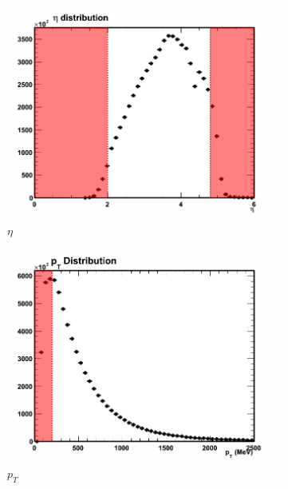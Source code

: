 \begin{figure}[h]
	\begin{subfigure}[h]{0.49\textwidth}
		\includegraphics[width=\textwidth]{./Chapters/multiplicity/images/track_selection_eta.png}
		\caption{$\eta$}
		\label{fig: track selection criteria eta}
	\end{subfigure}
	\begin{subfigure}[h]{0.49\textwidth}
		\includegraphics[width=\textwidth]{./Chapters/multiplicity/images/track_selection_pt.png}
		\caption{$p_T$}
		\label{fig: track selection criteria pt}
	\end{subfigure}
	\begin{subfigure}[h]{0.49\textwidth}

\end{subfigure}
\end{figure}
